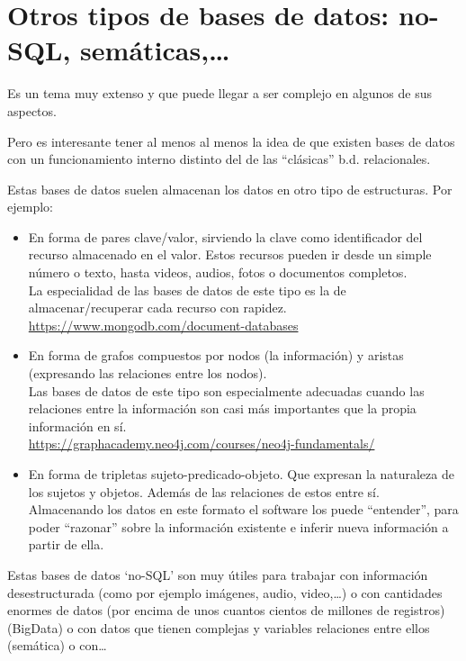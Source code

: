 \documentclass[spanish,12pt,a4paper,final,oneside]{book}
\begin{document}
\section{Otros tipos de bases de datos: no-SQL, semáticas,\ldots}
Es un tema muy extenso y que puede llegar a ser complejo en algunos de sus aspectos.

Pero es interesante tener al menos al menos la idea de que existen bases de datos con un funcionamiento interno distinto del de las ``clásicas'' b.d. relacionales.

Estas bases de datos suelen almacenan los datos en otro tipo de estructuras. Por ejemplo:
\begin{itemize}

\item En forma de pares clave/valor, sirviendo la clave como identificador del recurso almacenado en el valor. Estos recursos pueden ir desde un simple número o texto, hasta videos, audios, fotos o documentos completos.
\\La especialidad de las bases de datos de este tipo es la de almacenar/recuperar cada recurso con rapidez.
\\ \url{https://www.mongodb.com/document-databases}

\item En forma de grafos compuestos por nodos (la información) y aristas (expresando las relaciones entre los nodos).
\\Las bases de datos de este tipo son especialmente adecuadas cuando las relaciones entre la información son casi más importantes que la propia información en sí.
\\ \url{https://graphacademy.neo4j.com/courses/neo4j-fundamentals/} 

\item En forma de tripletas sujeto-predicado-objeto. Que expresan la naturaleza de los sujetos y objetos. Además de las relaciones de estos entre sí. 
\\Almacenando los datos en este formato el software los puede ``entender'', para poder ``razonar'' sobre la información existente e inferir nueva información a partir de ella.


\end{itemize}

Estas bases de datos `no-SQL' son muy útiles para trabajar con información desestructurada (como por ejemplo imágenes, audio, video,\ldots) o con cantidades enormes de datos (por encima de unos cuantos cientos de millones de registros)(BigData) o con datos que tienen complejas y variables relaciones entre ellos (semática) o con\ldots
\end{document}
